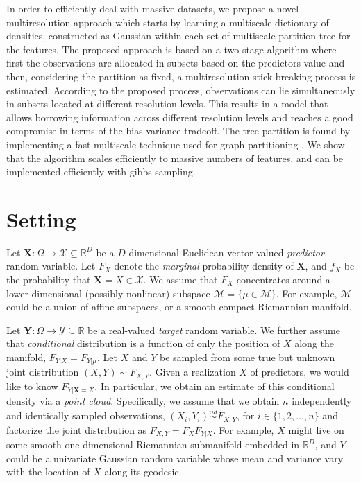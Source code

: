 \documentclass{article}
\newcommand{\iid}{\overset{iid}{\sim}}
\newcommand{\mbX}{\mathbf{X}}
\newcommand{\mbY}{\mathbf{Y}}
\newcommand{\Real}{\mathbb{R}}
\providecommand{\mc}[1]{\mathcal{#1}}
\newcommand{\from}{{\ensuremath{\colon}}}           %
\begin{document}
 In order to efficiently deal with massive datasets, we propose a novel multiresolution approach which starts by learning a multiscale dictionary of densities, constructed as Gaussian within each set of multiscale partition tree for the features. The proposed approach is based on a two-stage algorithm where first the observations are allocated in subsets based on the predictors value and then, considering the partition as fixed, a multiresolution stick-breaking process is estimated. According to the proposed process, observations can lie simultaneously in subsets located at different resolution levels. This results in a model that allows borrowing information across different resolution levels and reaches a good compromise in terms of the bias-variance tradeoff. The tree partition is found by implementing a fast multiscale technique used for graph partitioning \cite{metis}.  We show that the algorithm scales efficiently to massive numbers of features, and can be implemented efficiently with gibbs sampling. 



\section{Setting} %
Let $\mbX \from \Omega \to \mathcal{X} \subseteq \Real^D$ be a $D$-dimensional Euclidean vector-valued \emph{predictor} random variable.  Let $F_X$ denote the \emph{marginal} probability density of $\mbX$, and $f_X$ be the probability that  $\mbX=X \in \mc{X}$.  We assume that $F_X$ concentrates around a lower-dimensional (possibly nonlinear) subspace $\mc{M}=\{\mu \in \mc{M}\}$.  For example, $\mc{M}$ could be a union of affine subspaces, or a smooth compact Riemannian manifold.  

Let $\mbY \from \Omega \to  \mathcal{Y} \subseteq \Real$ be a real-valued \emph{target} random variable. We further assume that \emph{conditional} distribution is a function of only the position of $X$ along the manifold, $F_{Y|X}=F_{Y|\mu}$. Let $X$ and $Y$ be sampled from some true but unknown joint distribution $(X,Y) \sim F_{X,Y}$.  Given a realization $X$ of predictors, we would like to know $F_{Y| \mbX=X}$.  In particular, we obtain an estimate of this conditional density via a \emph{point cloud}.  Specifically, we assume that we obtain $n$ independently and identically sampled observations, $(X_i,Y_i) \iid F_{X,Y}$, for $i \in \{1,2,\ldots,n\}$ and factorize the joint distribution  as $F_{X,Y}=F_X F_{Y|X}$.  
For example, $X$ might live on some smooth one-dimensional Riemannian submanifold embedded in $\Real^D$, and  $Y$ could be a univariate Gaussian random variable whose mean and variance vary with the location of $X$ along its geodesic.  
\end{document}
